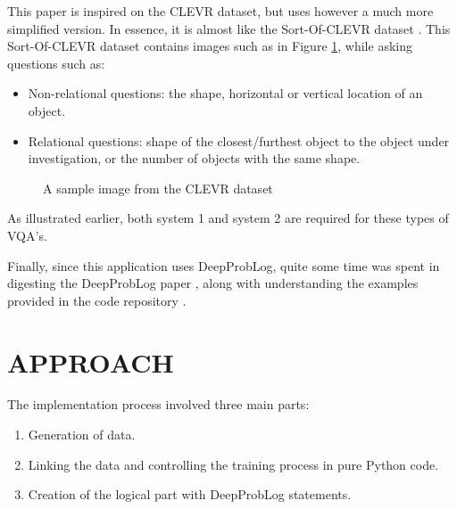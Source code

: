 \documentclass[english]{sobraep}
\begin{document}
This paper is inspired on the CLEVR dataset, but uses however a much more simplified version. In essence, it is almost like the Sort-Of-CLEVR dataset \cite{sort_of_clevr_dataset}. This Sort-Of-CLEVR dataset contains images such as in Figure \ref{fig:sample_image_sort_of_clevr}, while asking questions such as:
\begin{itemize}
    \item Non-relational questions: the shape, horizontal or vertical location of an object.
    \item Relational questions: shape of the closest/furthest object to the object under investigation, or the number of objects with the same shape.
\end{itemize}

\begin{figure}[htp]
    \begin{center}
    \captionsetup{justification=centering}
    \caption{A sample image from the CLEVR dataset \cite{sort_of_clevr_dataset}}
    \label{fig:sample_image_sort_of_clevr}
    \end{center}
\end{figure}

As illustrated earlier, both system 1 and system 2 are required for these types of VQA's.

Finally, since this application uses DeepProbLog, quite some time was spent in digesting the DeepProbLog paper \cite{deepproblog}, along with understanding the  examples provided in the code repository \cite{deepproblog_code}.

\section{APPROACH}
\label{sec:approach}
The implementation process involved three main parts:
\begin{enumerate}
    \item Generation of data.
    \item Linking the data and controlling the training process in pure Python code.
    \item Creation of the logical part with DeepProbLog statements.
\end{enumerate}
\end{document}
